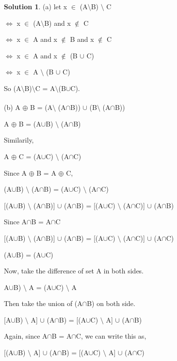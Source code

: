 \documentclass{article}
\theoremstyle{definition}
\newtheorem*{solution}{Solution}
\begin{document}
\begin{solution}
(a) let x \(\in\)  (A\(\setminus\)B) \(\setminus\) C

\(\Leftrightarrow\) x \(\in\)  (A\(\setminus\)B) and x \(\notin\) C

\(\Leftrightarrow\) x \(\in\) A and x \(\notin\) B and x \(\notin\) C

\(\Leftrightarrow\) x \(\in\) A and x \(\notin\) (B \(\cup\) C)

\(\Leftrightarrow\) x \(\in\) A \(\setminus\) (B \(\cup\) C)

So (A\(\setminus\)B)\(\setminus\)C = A\(\setminus\)(B\(\cup\)C).\\\\




(b) A \(\oplus\) B = (A\(\setminus\) (A\(\cap\)B)) \(\cup\) (B\(\setminus\) (A\(\cap\)B))

A \(\oplus\) B = (A\(\cup\)B) \(\setminus\) (A\(\cap\)B)

Similarily,

A \(\oplus\) C = (A\(\cup\)C) \(\setminus\) (A\(\cap\)C)

Since A \(\oplus\) B = A \(\oplus\) C,

 (A\(\cup\)B) \(\setminus\) (A\(\cap\)B) = (A\(\cup\)C) \(\setminus\) (A\(\cap\)C)
 
 [(A\(\cup\)B) \(\setminus\) (A\(\cap\)B)] \(\cup\) (A\(\cap\)B) = [(A\(\cup\)C) \(\setminus\) (A\(\cap\)C)] \(\cup\) (A\(\cap\)B)
 
 Since A\(\cap\)B = A\(\cap\)C
 
  [(A\(\cup\)B) \(\setminus\) (A\(\cap\)B)] \(\cup\) (A\(\cap\)B) = [(A\(\cup\)C) \(\setminus\) (A\(\cap\)C)] \(\cup\) (A\(\cap\)C)
  
(A\(\cup\)B) = (A\(\cup\)C)

Now, take the difference of set A in both sides.

A\(\cup\)B) \(\setminus\) A = (A\(\cup\)C) \(\setminus\) A

Then take the union of (A\(\cap\)B) on both side.

[A\(\cup\)B) \(\setminus\) A] \(\cup\) (A\(\cap\)B) = [(A\(\cup\)C) \(\setminus\) A] \(\cup\) (A\(\cap\)B)

Again, since A\(\cap\)B = A\(\cap\)C, we can write this as,

[(A\(\cup\)B) \(\setminus\) A] \(\cup\) (A\(\cap\)B) = [(A\(\cup\)C) \(\setminus\) A] \(\cup\) (A\(\cap\)C)\\


\end{solution}
\end{document}

